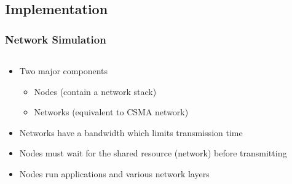 \documentclass[compress]{beamer}
\begin{document}
    \subsection{Implementation}
    \begin{frame}
        \frametitle{Network Simulation}
        \begin{columns}
            \begin{column}{0.7\textwidth}
                \begin{itemize}
                    \item Two major components
                    \begin{itemize}
                        \item Nodes (contain a network stack)
                        \item Networks (equivalent to CSMA network)
                    \end{itemize}
                    \item Networks have a bandwidth which limits transmission time
                    \item Nodes must wait for the shared resource (network) before transmitting
                    \item Nodes run applications and various network layers
                \end{itemize}
            \end{column}


\end{columns}
\end{frame}
\end{document}
